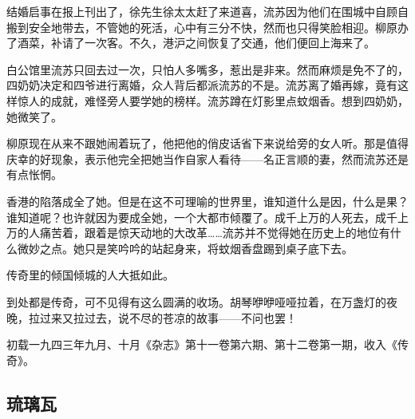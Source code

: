 \par 结婚启事在报上刊出了，徐先生徐太太赶了来道喜，流苏因为他们在围城中自顾自搬到安全地带去，不管她的死活，心中有三分不快，然而也只得笑脸相迎。柳原办了酒菜，补请了一次客。不久，港沪之间恢复了交通，他们便回上海来了。
\par 白公馆里流苏只回去过一次，只怕人多嘴多，惹出是非来。然而麻烦是免不了的，四奶奶决定和四爷进行离婚，众人背后都派流苏的不是。流苏离了婚再嫁，竟有这样惊人的成就，难怪旁人要学她的榜样。流苏蹲在灯影里点蚊烟香。想到四奶奶，她微笑了。
\par 柳原现在从来不跟她闹着玩了，他把他的俏皮话省下来说给旁的女人听。那是值得庆幸的好现象，表示他完全把她当作自家人看待——名正言顺的妻，然而流苏还是有点怅惘。
\par 香港的陷落成全了她。但是在这不可理喻的世界里，谁知道什么是因，什么是果？谁知道呢？也许就因为要成全她，一个大都市倾覆了。成千上万的人死去，成千上万的人痛苦着，跟着是惊天动地的大改革……流苏并不觉得她在历史上的地位有什么微妙之点。她只是笑吟吟的站起身来，将蚊烟香盘踢到桌子底下去。
\par 传奇里的倾国倾城的人大抵如此。
\par 到处都是传奇，可不见得有这么圆满的收场。胡琴咿咿哑哑拉着，在万盏灯的夜晚，拉过来又拉过去，说不尽的苍凉的故事——不问也罢！
\par {}
\par *初载一九四三年九月、十月《杂志》第十一卷第六期、第十二卷第一期，收入《传奇》。



\subsection{琉璃瓦}


